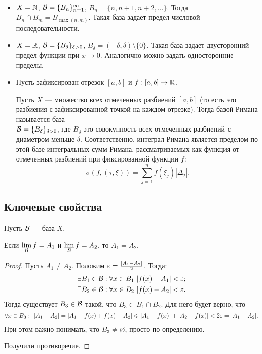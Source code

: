 \begin{Examples}\ 
\begin{itemize}
\item $X = \mathbb{N}$, $\mathcal{B} = \{B_n\}_{n=1}^{\infty}$, $B_n = \{n, n+1, n+2, \ldots  \}$. Тогда $B_n \cap B_m = B_{\max(n, m)}$. Такая база задает предел числовой последовательности.
\item $X = \mathbb{R}$, $\mathcal{B} = \{B_\delta\}_{\delta>0}$, $B_\delta = (-\delta, \delta)\setminus \{0\}$. Такая база задает двусторонний предел функции при $x\to 0$. Аналогично можно задать односторонние пределы.
\item Пусть зафиксирован отрезок $[a, b]$ и $f:[a, b] \to \mathbb{R}$.

Пусть $X$ --- множество всех отмеченных разбиений $[a, b]$ (то есть это разбиения с зафиксированной точкой на каждом отрезке). Тогда базой Римана называется база\\ $\mathcal{B} = \{B_\delta\}_{\delta>0}$, где $B_\delta$ это совокупность всех отмеченных разбиений с диаметром меньше $\delta$. Соответственно, интеграл Римана является пределом по 
этой базе интегральных сумм Римана, рассматриваемых как функция от отмеченных разбиений при фиксированной функции $f$:
$$
\sigma(f, (\tau, \xi)) = \sum\limits_{j=1}^{n}f(\xi_j)|\Delta_j|.
$$
\end{itemize}
\end{Examples}

\subsection{Ключевые свойства}
Пусть $\mathcal{B}$ --- база $X$.

\begin{Statement}
Если $\lim\limits_{\mathcal{B}} f = A_1$ и $\lim\limits_{\mathcal{B}} f = A_2$, то $A_1 = A_2$.
\end{Statement}
\begin{proof}
Пусть $A_1 \neq A_2$. Положим $\varepsilon = \frac{|A_1 - A_2|}{2}$. Тогда:
\begin{align*}
& \exists B_1 \in \mathcal{B}: \forall x \in B_1\ |f(x) - A_1| < \varepsilon; \\
& \exists B_2 \in \mathcal{B}: \forall x \in B_2\ |f(x) - A_2| < \varepsilon.
\end{align*}
Тогда существует $B_3 \in \mathcal{B}$ такой, что $B_3 \subset B_1 \cap B_2$. Для него будет верно, что
$$
\forall x \in B_3:\ |A_1 - A_2| = |A_1 - f(x) + f(x) - A_2| \leqslant |A_1 - f(x)| + |A_2 - f(x)| < 2\varepsilon = |A_1 - A_2|.
$$
При этом важно понимать, что $B_3 \neq \varnothing$, просто по определению.

Получили противоречие.
\end{proof}

